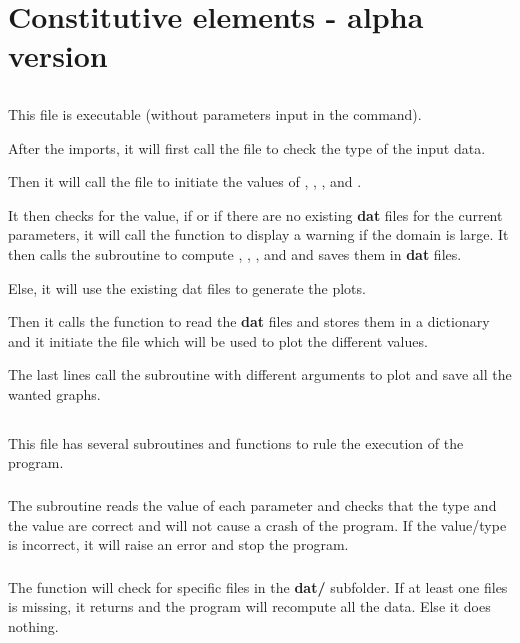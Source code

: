 \section{Constitutive elements - alpha version}
\subsection{}
This file is executable (without parameters input in the command).

After the imports, it will first call the file  to check the
type of the input data.

Then it will call the file  to initiate
the values of , , ,  and .

It then checks for the  value, if  or if there are no
existing \textbf{dat} files for the current parameters, it will call
the function  to display a warning if the domain is large.
It then calls the subroutine  to compute ,
, ,  and  and saves them in
\textbf{dat} files.

Else, it will use the existing dat files to generate the plots.

Then it calls the function  to read the \textbf{dat} files and
stores them in a dictionary and it initiate the file  which will be
used to plot the different values.

The last lines call the subroutine  with different arguments
to plot and save all the wanted graphs.

\subsection{}
This file has several subroutines and functions to rule the execution of the
program.

\subsubsection{\textcolor{func}{}}
The subroutine \textcolor{func}{} reads the value of each
parameter and checks that the type and the value are correct and will not cause
a crash of the program. If the value/type is incorrect, it will raise an error
and stop the program.

\subsubsection{\textcolor{func}{}}
The function \textcolor{func}{} will check for specific
files in the \textbf{dat/} subfolder. If at least one files is missing, it
returns  and the program will recompute all the data. Else it does
nothing.

